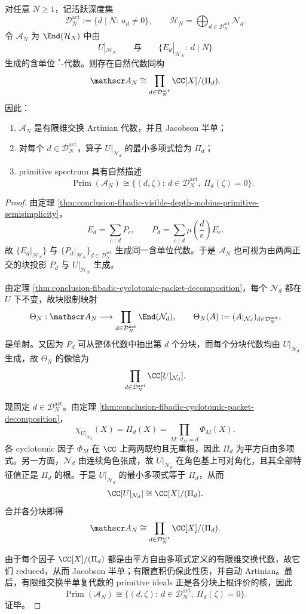 \begin{theorem}\label{thm:conclusion-fibadic-joint-observer-algebra-cyclotomic-product}
对任意 \(N\ge 1\)，记活跃深度集
\[
\mathcal D_N^{\mathrm{act}}:=\{d\mid N:\ a_d\neq 0\},
\qquad
\mathcal H_N=\bigoplus_{d\in\mathcal D_N^{\mathrm{act}}}\mathcal N_d.
\]
令 \(\mathscr A_N\) 为 \(\End(\mathcal H_N)\) 中由
\[
U|_{\mathcal H_N}
\qquad\text{与}\qquad
\{E_d|_{\mathcal H_N}:\ d\mid N\}
\]
生成的含单位 \(^*\)-代数。则存在自然代数同构
\[
\mathscr A_N
\cong
\prod_{d\in\mathcal D_N^{\mathrm{act}}}\CC[X]/(\Pi_d).
\]
因此：
\begin{enumerate}
  \item \(\mathscr A_N\) 是有限维交换 Artinian 代数，并且 Jacobson 半单；
  \item 对每个 \(d\in\mathcal D_N^{\mathrm{act}}\)，算子 \(U|_{\mathcal N_d}\) 的最小多项式恰为 \(\Pi_d\)；
  \item primitive spectrum 具有自然描述
  \[
  \operatorname{Prim}(\mathscr A_N)
  \cong
  \{(d,\zeta):\ d\in\mathcal D_N^{\mathrm{act}},\ \Pi_d(\zeta)=0\}.
  \]
\end{enumerate}
\end{theorem}
\begin{proof}
由定理 \ref{thm:conclusion-fibadic-visible-depth-mobius-primitive-semisimplicity}，
\[
E_d=\sum_{e\mid d}P_e,
\qquad
P_d=\sum_{e\mid d}\mu\!\left(\frac{d}{e}\right)E_e.
\]
故 \(\{E_d|_{\mathcal H_N}\}\) 与 \(\{P_d|_{\mathcal H_N}\}_{d\in\mathcal D_N^{\mathrm{act}}}\) 生成同一含单位代数。于是 \(\mathscr A_N\) 也可视为由两两正交的块投影 \(P_d\) 与 \(U|_{\mathcal H_N}\) 生成。

由定理 \ref{thm:conclusion-fibadic-cyclotomic-packet-decomposition}，每个 \(\mathcal N_d\) 都在 \(U\) 下不变，故块限制映射
\[
\Theta_N:\mathscr A_N\longrightarrow \prod_{d\in\mathcal D_N^{\mathrm{act}}}\End(\mathcal N_d),
\qquad
\Theta_N(A):=(A|_{\mathcal N_d})_{d\in\mathcal D_N^{\mathrm{act}}},
\]
是单射。又因为 \(P_d\) 可从整体代数中抽出第 \(d\) 个分块，而每个分块代数均由 \(U|_{\mathcal N_d}\) 生成，故 \(\Theta_N\) 的像恰为
\[
\prod_{d\in\mathcal D_N^{\mathrm{act}}}\CC[U|_{\mathcal N_d}].
\]

现固定 \(d\in\mathcal D_N^{\mathrm{act}}\)。由定理 \ref{thm:conclusion-fibadic-cyclotomic-packet-decomposition}，
\[
\chi_{U|_{\mathcal N_d}}(X)=\Pi_d(X)
=
\prod_{M:\ d_M=d}\Phi_M(X).
\]
各 cyclotomic 因子 \(\Phi_M\) 在 \(\CC\) 上两两既约且无重根，因此 \(\Pi_d\) 为平方自由多项式。另一方面，\(\mathcal N_d\) 由连续角色张成，故 \(U|_{\mathcal N_d}\) 在角色基上可对角化，且其全部特征值正是 \(\Pi_d\) 的根。于是 \(U|_{\mathcal N_d}\) 的最小多项式等于 \(\Pi_d\)，从而
\[
\CC[U|_{\mathcal N_d}]
\cong
\CC[X]/(\Pi_d).
\]
合并各分块即得
\[
\mathscr A_N
\cong
\prod_{d\in\mathcal D_N^{\mathrm{act}}}\CC[X]/(\Pi_d).
\]

由于每个因子 \(\CC[X]/(\Pi_d)\) 都是由平方自由多项式定义的有限维交换代数，故它们 reduced，从而 Jacobson 半单；有限直积仍保此性质，并自动 Artinian。最后，有限维交换半单复代数的 primitive ideals 正是各分块上根评价的核，因此
\[
\operatorname{Prim}(\mathscr A_N)
\cong
\{(d,\zeta):\ d\in\mathcal D_N^{\mathrm{act}},\ \Pi_d(\zeta)=0\}.
\]
证毕。
\end{proof}


